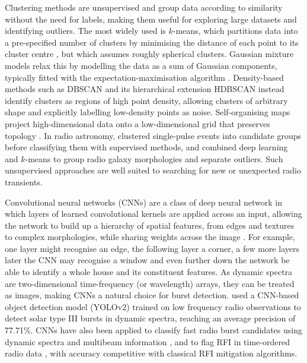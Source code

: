 Clustering methods are unsupervised and group data according to similarity without the need for labels, making them useful for exploring large datasets and identifying outliers. The most widely used is $k$-means, which partitions data into a pre-specified number of clusters by minimising the distance of each point to its cluster centre \citep{lloyd_least_1982}, but which assumes roughly spherical clusters. Gaussian mixture models relax this by modelling the data as a sum of Gaussian components, typically fitted with the expectation-maximisation algorithm \citep{dempster_maximum_1977}. Density-based methods such as DBSCAN \citep{ester_density-based_1996} and its hierarchical extension HDBSCAN \citep{campello_density-based_2013} instead identify clusters as regions of high point density, allowing clusters of arbitrary shape and explicitly labelling low-density points as noise. Self-organising maps project high-dimensional data onto a low-dimensional grid that preserves topology \citep{kohonen_self-organized_1982}. In radio astronomy, \cite{pang_novel_2018} clustered single-pulse events into candidate groups before classifying them with supervised methods, and \cite{ralph_radio_2019} combined deep learning and $k$-means to group radio galaxy morphologies and separate outliers. Such unsupervised approaches are well suited to searching for new or unexpected radio transients.

Convolutional neural networks (CNNs) are a class of deep neural network in which layers of learned convolutional kernels are applied across an input, allowing the network to build up a hierarchy of spatial features, from edges and textures to complex morphologies, while sharing weights across the image \citep{lecun_gradient-based_1998}. For example, one layer might recognise an edge, the following layer a corner, a few more layers later the CNN may recognise a window and even further down the network be able to identify a whole house and its constituent features. As dynamic spectra are two-dimensional time-frequency (or wavelength) arrays, they can be treated as images, making CNNs a natural choice for burst detection. \cite{scully_improved_2023} used a CNN-based object detection model (YOLOv2) trained on low frequency radio observations to detect solar type III bursts in dynamic spectra, reaching an average precision of 77.71\%. CNNs have also been applied to classify fast radio burst candidates using dynamic spectra and multibeam information \citep{connor_applying_2018}, and to flag RFI in time-ordered radio data \citep{ronneberger_u-net_2015, akeret_radio_2017}, with accuracy competitive with classical RFI mitigation algorithms. 

